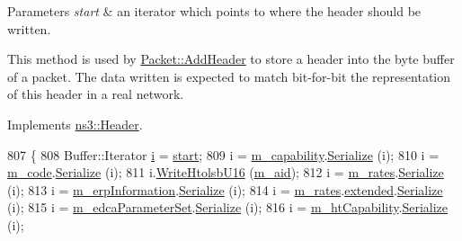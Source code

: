 \begin{DoxyParams}{Parameters}
{\em start} & an iterator which points to where the header should be written.\\
\hline
\end{DoxyParams}
This method is used by \hyperlink{classns3_1_1Packet_a465108c595a0bc592095cbcab1832ed8}{Packet\+::\+Add\+Header} to store a header into the byte buffer of a packet. The data written is expected to match bit-\/for-\/bit the representation of this header in a real network. 

Implements \hyperlink{classns3_1_1Header_afb61f1aac69ff8349a6bfe521fab5404}{ns3\+::\+Header}.


\begin{DoxyCode}
807 \{
808   Buffer::Iterator \hyperlink{bernuolliDistribution_8m_a6f6ccfcf58b31cb6412107d9d5281426}{i} = \hyperlink{namespacevisualizer_1_1core_a2a35e5d8a34af358b508dac8635754e0}{start};
809   i = \hyperlink{classns3_1_1MgtAssocResponseHeader_a785f2468beb110300bcdda8b4a168bce}{m\_capability}.\hyperlink{classns3_1_1CapabilityInformation_ae2671dc343fe7d7a756ef5915f2f6aa8}{Serialize} (i);
810   i = \hyperlink{classns3_1_1MgtAssocResponseHeader_affb9552fb07209f8312048615ba08a32}{m\_code}.\hyperlink{classns3_1_1StatusCode_abebdc2f5497fcca072299400e4ee1b2b}{Serialize} (i);
811   i.\hyperlink{classns3_1_1Buffer_1_1Iterator_a2e89a2939c01994a490d6f0be22770a1}{WriteHtolsbU16} (\hyperlink{classns3_1_1MgtAssocResponseHeader_abc46e106fb706b35ed61adbd099306f8}{m\_aid});
812   i = \hyperlink{classns3_1_1MgtAssocResponseHeader_a49cb0162ba9a28777aa753fd1ba71193}{m\_rates}.\hyperlink{classns3_1_1WifiInformationElement_a2f43932681fae6e2bc7a978e9493811e}{Serialize} (i);
813   i = \hyperlink{classns3_1_1MgtAssocResponseHeader_a28551f55f902a75fd5434340d52c0356}{m\_erpInformation}.\hyperlink{classns3_1_1ErpInformation_a797d76e95ddcd5e6b0cad49443b2c356}{Serialize} (i);
814   i = \hyperlink{classns3_1_1MgtAssocResponseHeader_a49cb0162ba9a28777aa753fd1ba71193}{m\_rates}.\hyperlink{classns3_1_1SupportedRates_a313f3392cbf8248cf2822d53f3914aaf}{extended}.\hyperlink{classns3_1_1ExtendedSupportedRatesIE_acb470467b1268b5897cdc916078f2b46}{Serialize} (i);
815   i = \hyperlink{classns3_1_1MgtAssocResponseHeader_a435296135d8636a5bef9b8d6c3826e56}{m\_edcaParameterSet}.\hyperlink{classns3_1_1EdcaParameterSet_ae0ef4ff2e5549a3c0a2fa12cc73af425}{Serialize} (i);
816   i = \hyperlink{classns3_1_1MgtAssocResponseHeader_aa2ebab65687bbc0ea342d6a55236cb87}{m\_htCapability}.\hyperlink{classns3_1_1HtCapabilities_a91a16fe63128b8463bbc8697de061645}{Serialize} (i);

\end{DoxyCode}
